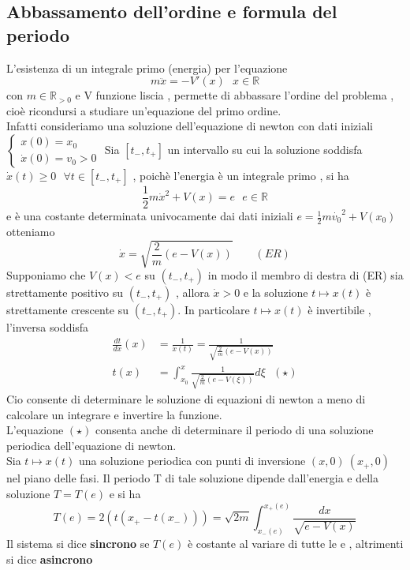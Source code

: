 \documentclass{article}
\theoremstyle{definition}
\newcommand{\R}{\mathbb{R}}
\begin{document}
 	\subsection{Abbassamento dell'ordine e formula del periodo}
 	L'esistenza di un integrale primo (energia) per l'equazione $$m \ddot{x}=-V'(x) \ \ \ x \in \R$$ con $m \in \R_{>0} $ e V funzione liscia , permette di abbassare l'ordine del problema , cioè ricondursi a studiare un'equazione del primo ordine. \\ 
 	Infatti consideriamo una soluzione dell'equazione di newton con dati iniziali $\begin{cases}
 		x(0)=x_0 \\
 		\dot{x}(0)=v_0 > 0
 	\end{cases} $
 	Sia $[t_-,t_+]$ un intervallo su cui la soluzione soddisfa $\dot{x}(t) \geq 0 \ \ \ \forall t \in [t_-,t_+]$ , poichè l'energia è un integrale primo , si ha 
 	$$\frac{1}{2}m\dot{x}^2+V(x)=e \ \ \ e \in \R $$ 
 	e è una costante determinata univocamente dai dati iniziali $e=\frac{1}{2}m \dot{v_0}^2+V(x_0)$ otteniamo $$\dot{x}=\sqrt{\frac{2}{m}(e-V(x))}\ \ \ \  \   \ \ \ \  (ER)$$
 	Supponiamo che $V(x)< e$ su $(t_-,t_+)$ in modo il membro di destra  di (ER) sia strettamente positivo su $(t_-,t_+)$ , allora $\dot{x} > 0 $ e la soluzione $t \mapsto x(t)$ è strettamente crescente su $(t_-,t_+)$. In particolare $t \mapsto x(t)$ è invertibile , l'inversa soddisfa 
 	\begin{align*}
 		\frac{dt}{dx}(x)&=\frac{1}{\dot{x}(t)} = \frac{1}{\sqrt{\frac{2}{m}(e-V(x))}} \\
 		t(x)&=\int_{x_0}^{x}\frac{1}{\sqrt{\frac{2}{m}(e-V(\xi))}} d\xi  \ \ \  (\star)
 	\end{align*}
 	Cio consente di determinare le soluzione di equazioni di newton a meno di calcolare un integrare e invertire la funzione.\\
 	L'equazione $(\star)$ consenta anche di determinare il periodo di una soluzione periodica dell'equazione di newton. \\
 	Sia $t \mapsto x(t)$ una soluzione periodica con punti di inversione $(x,0) \ (x_+,0) $ nel piano delle fasi. Il periodo T di tale soluzione dipende dall'energia e della soluzione $T=T(e)$ e si ha 
 	$$T(e)=2(t(x_+-t(x_-)))=\sqrt{2m}\int_{x_-(e)}^{x_+(e)} \frac{dx}{\sqrt{e-V(x)}}$$
 	Il sistema si dice \textbf{sincrono} se $T(e)$ è costante al variare di tutte le e , altrimenti si dice \textbf{asincrono }
 		
\end{document}
